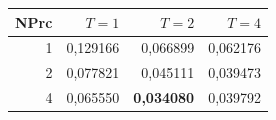 \begin{tabular}{@{}rrrr@{}}
\toprule
NPrc & $T=1$ & $T=2$ & $T=4$ \\
\midrule
1 & 0{,}129166 & 0{,}066899 & 0{,}062176 \\
2 & 0{,}077821 & 0{,}045111 & 0{,}039473 \\
4 & 0{,}065550 & \textbf{0{,}034080} & 0{,}039792 \\
\bottomrule
\end{tabular}
